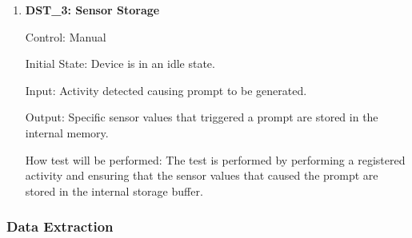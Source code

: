 \documentclass[12pt, titlepage]{article}
\begin{document}
\begin{enumerate}
	\item{\textbf{DST\_3: Sensor Storage} \\}\label{DST3}
	
		Control: Manual 
							
		Initial State: Device is in an idle state.
							
		Input: Activity detected causing prompt to be generated.
		
		Output: Specific sensor values that triggered a prompt are stored in the internal memory.
							
		How test will be performed: The test is performed by performing a registered activity and ensuring that the sensor values that caused the prompt are stored in the internal storage buffer.
\end{enumerate}
\subsubsection{Data Extraction}
\end{document}
